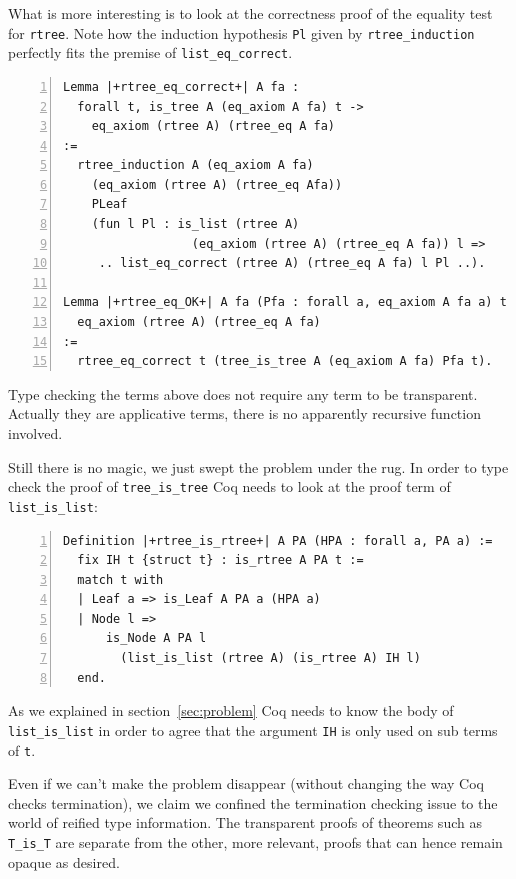 \documentclass[sigplan,10pt,review]{acmart}\settopmatter{printfolios=true,printccs=false,printacmref=false}
\begin{document}
\noindent
What is more interesting is to look at the correctness 
proof of the equality test
for \lstinline+rtree+. Note how the induction hypothesis
\lstinline+Pl+
given by \lstinline+rtree_induction+ perfectly fits
the premise of \lstinline+list_eq_correct+.

\begin{minipage}{\textwidth}\begin{lstlisting}[numbers=left]
Lemma |+rtree_eq_correct+| A fa :
  forall t, is_tree A (eq_axiom A fa) t ->
    eq_axiom (rtree A) (rtree_eq A fa)
:=
  rtree_induction A (eq_axiom A fa)
    (eq_axiom (rtree A) (rtree_eq Afa))
    PLeaf
    (fun l Pl : is_list (rtree A) 
                  (eq_axiom (rtree A) (rtree_eq A fa)) l =>
     .. list_eq_correct (rtree A) (rtree_eq A fa) l Pl ..).

Lemma |+rtree_eq_OK+| A fa (Pfa : forall a, eq_axiom A fa a) t :
  eq_axiom (rtree A) (rtree_eq A fa)
:=
  rtree_eq_correct t (tree_is_tree A (eq_axiom A fa) Pfa t).
\end{lstlisting}\end{minipage}

Type checking the terms above does not require any term to be
transparent. Actually they are applicative terms, there is no
apparently recursive function involved.

Still there is no magic, we just swept the problem under the rug.
In order to type check the proof
of \lstinline+tree_is_tree+ Coq needs to look at the
proof term of \lstinline+list_is_list+:

\begin{minipage}{\textwidth}\begin{lstlisting}[numbers=left]
Definition |+rtree_is_rtree+| A PA (HPA : forall a, PA a) :=
  fix IH t {struct t} : is_rtree A PA t :=
  match t with
  | Leaf a => is_Leaf A PA a (HPA a)
  | Node l =>
      is_Node A PA l
        (list_is_list (rtree A) (is_rtree A) IH l)
  end.
\end{lstlisting}\end{minipage}

\noindent
As we explained in section~\ref{sec:problem} Coq needs to know the
body of  \lstinline+list_is_list+ in order to agree that the argument
\lstinline+IH+ is only used on sub terms of \lstinline+t+.

Even if we can't make the problem disappear (without changing the way Coq
checks termination), we claim we confined the termination checking issue
to the world of reified type information. The transparent proofs of
theorems such as \lstinline+T_is_T+ are separate from the other, more
relevant, proofs that can hence remain opaque as desired.
\end{document}
